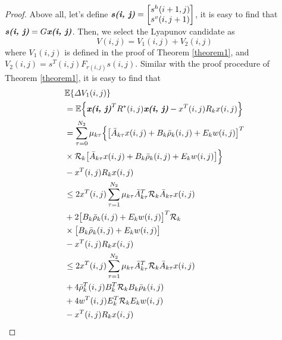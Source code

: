 \documentclass[journal,final,twocolumn]{IEEEtran}
\begin{document}
\begin{proof} 
	Above all, let's define $\emph{\textbf{s(i, j)}} = \begin{bmatrix}
	s^{h}(i+1,j)\\ s^{v}(i,j+1)
	\end{bmatrix}$,  it is easy to find that $\emph{\textbf{s(i, j)}}=G\emph{\textbf{x(i, j)}}$.  Then, we select the Lyapunov candidate as
	\begin{equation}\label{LyapunoovT}
		V(i,j)=V_{1}(i,j)+V_{2}(i,j)
	\end{equation}
	where $V_{1}(i,j)$ is defined in the proof of Theorem \ref{theorem1}, and $V_{2}(i,j)=s^{T}(i,j)F_{r(i,j)}s(i,j)$. Similar with the proof procedure of Theorem \ref{theorem1}, it is easy to find that
	\begin{equation} \label{P2T1}
		\begin{split}
				&\mathbb{E}\{\varDelta V_{1}(i,j) \}\\
			&=\mathbb{E}\Big\{\emph{\textbf{x(i, j)}}^{T}R^{*}(i,j)\emph{\textbf{x(i, j)}} - x^{T}(i,j)R_{k}x(i,j)\Big\}\\
			&=  \sum_{\tau =0}^{N_{2}}\mu_{k\tau }\Big\{\big[\bar{A}_{k\tau }x(i,j)+B_{k}\bar{\rho}_{k}(i,j)+E_{k}w(i,j)\big]^{T}\\
			&\times\mathcal{R}_{k} \big[ \bar{A}_{k\tau }x(i,j)+B_{k}\bar{\rho}_{k}(i,j)+E_{k}w(i,j)\big]\Big\}\\
			&-x^{T}(i,j)R_{k}x(i,j)\\
			&\leq 2x^{T}(i,j)\sum_{\tau =1}^{N_{2}}\mu_{k\tau }\bar{A}^{T}_{k\tau }\mathcal{R}_{k}\bar{A}_{k\tau }x(i,j) \\
			&+2\big[B_{k}\bar{\rho}_{k}(i,j)+E_{k}w(i,j)\big]^{T}\mathcal{R}_{k}\\
			&\times\big[B_{k}\bar{\rho}_{k}(i,j)+E_{k}w(i,j)\big]\\
			&-x^{T}(i,j)R_{k}x(i,j)\\
			&\leq 2x^{T}(i,j)\sum_{\tau =1}^{N_{2}}\mu_{k\tau }\bar{A}^{T}_{k\tau }\mathcal{R}_{k}\bar{A}_{k\tau }x(i,j) \\
			&+ 4\bar{\rho}^{T}_{k}(i,j)B^{T}_{k}\mathcal{R}_{k}B_{k}\bar{\rho}_{k}(i,j)\\
			&+4w^{T}(i,j)E^{T}_{k}\mathcal{R}_{k}E_{k}w(i,j)\\
			&-x^{T}(i,j)R_{k}x(i,j)

\end{split}
\end{equation}
\end{proof}
\end{document}
